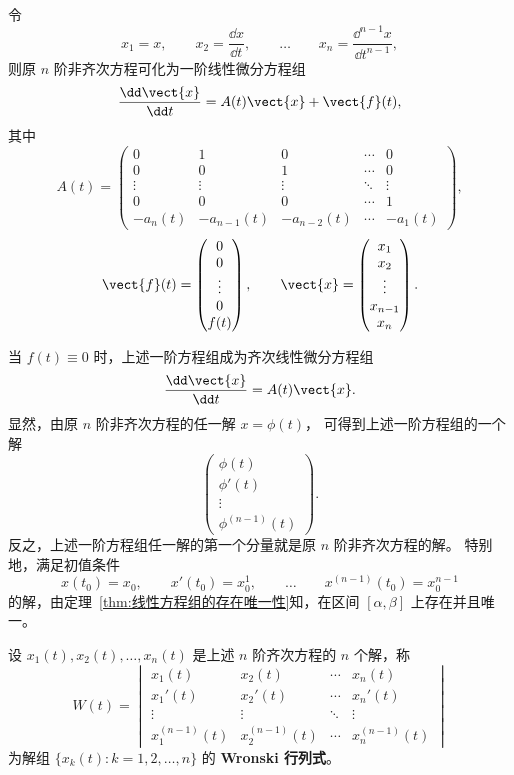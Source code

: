 令
\[
	x_1=x,
	\qquad
	x_2=\dfrac{\dd x}{\dd t},
	\qquad\ldots\qquad
	x_n=\dfrac{\dd^{n-1}x}{\dd t^{n-1}},
\]
则原 $n$ 阶非齐次方程可化为一阶线性微分方程组
\[
	\dfrac{\dd\vect{x}}{\dd t}
	=A(t)\vect{x}+\vect{f}(t),
\]
其中
\[
	A(t)=
	\begin{pmatrix}
		0       & 1          & 0          & \cdots & 0\\
		0       & 0          & 1          & \cdots & 0\\
		\vdots  & \vdots     & \vdots     & \ddots & \vdots\\
		0       & 0          & 0          & \cdots & 1\\
		-a_n(t) & -a_{n-1}(t)& -a_{n-2}(t)& \cdots & -a_1(t)
	\end{pmatrix},
\]
\[
	\vect{f}(t)=
	\begin{pmatrix}
		0\\
		0\\
		\vdots\\
		0\\
		f(t)
	\end{pmatrix},
	\qquad
	\vect{x}=
	\begin{pmatrix}
		x_1\\
		x_2\\
		\vdots\\
		x_{n-1}\\
		x_n
	\end{pmatrix}.
\]

当 $f(t)\equiv 0$ 时，上述一阶方程组成为齐次线性微分方程组
\[
	\dfrac{\dd\vect{x}}{\dd t}=A(t)\vect{x}.
\]
显然，由原 $n$ 阶非齐次方程的任一解 $x=\phi(t)$，
可得到上述一阶方程组的一个解
\[
	\begin{pmatrix}
		\phi(t)\\
		\phi'(t)\\
		\vdots\\
		\phi^{(n-1)}(t)
	\end{pmatrix}.
\]
反之，上述一阶方程组任一解的第一个分量就是原 $n$ 阶非齐次方程的解。
特别地，满足初值条件
\[
	x(t_0)=x_0,
	\qquad
	x'(t_0)=x_0^{1},
	\qquad\ldots\qquad
	x^{(n-1)}(t_0)=x_0^{n-1}
\]
的解，由定理~\ref{thm:线性方程组的存在唯一性}知，在区间
$[\alpha,\beta]$ 上存在并且唯一。

\begin{definition}\label{def:高阶线性方程的Wronski行列式}
	设 $x_1(t),x_2(t),\ldots,x_n(t)$ 是上述 $n$ 阶齐次方程的 $n$ 个解，称
	\[
		W(t)=
		\begin{vmatrix}
			x_1(t) & x_2(t) & \cdots & x_n(t)\\
			x_1'(t) & x_2'(t) & \cdots & x_n'(t)\\
			\vdots & \vdots & \ddots & \vdots\\
			x_1^{(n-1)}(t) & x_2^{(n-1)}(t) & \cdots & x_n^{(n-1)}(t)
		\end{vmatrix}
	\]
	为解组 $\{x_k(t):k=1,2,\ldots,n\}$ 的 \textbf{Wronski 行列式}。
\end{definition}

